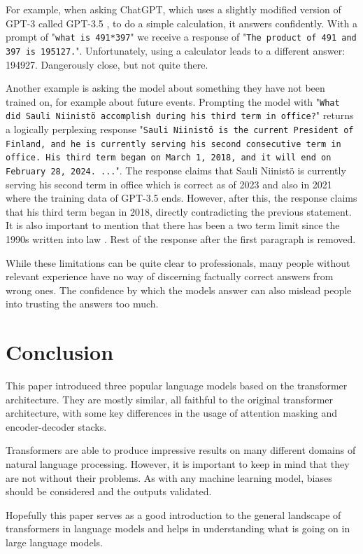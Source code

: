 \documentclass[twoside]{article}
\begin{document}
For example, when asking ChatGPT, which uses a slightly modified version of GPT-3 called 
GPT-3.5 \cite{noauthor_introducing_nodate-1}, to do a simple calculation, it answers confidently. 
With a prompt of "\texttt{what is 491*397}" we receive a response of 
"\texttt{The product of 491 and 397 is 195127.}". Unfortunately, using a calculator
leads to a different answer: 194927. Dangerously close, but not quite there.

Another example is asking the model about something they have not been trained on, for
example about future events. Prompting the model with 
"\texttt{What did Sauli Niinistö accomplish during his third term in office?}" returns
a logically perplexing response "\texttt{Sauli Niinistö is the current President of Finland, 
and he is currently serving his second consecutive term in office. 
His third term began on March 1, 2018, and it will end on February 28, 2024. ...}".
The response claims that Sauli Niinistö is currently serving his second term in office
which is correct as of 2023 and also in 2021 where the training data of GPT-3.5 ends. 
However, after this, the response claims that his third term began
in 2018, directly contradicting the previous statement. It is also important to mention
that there has been a two term limit since the 1990s written into law 
\cite{oy_finlex_nodate}. Rest of the response after the first paragraph is removed.

While these limitations can be quite clear to professionals, many people without relevant
experience have no way of discerning factually correct answers from wrong ones. The confidence
by which the models answer can also mislead people into trusting the answers too much.


\section{Conclusion}
This paper introduced three popular language models based on the transformer architecture.
They are mostly similar, all faithful to the original transformer architecture, with
some key differences in the usage of attention masking and encoder-decoder stacks.

Transformers are able to produce impressive results on many different domains of natural
language processing. However, it is important to keep in mind that they are not without 
their problems. As with any machine learning model,
biases should be considered and the outputs validated. 

Hopefully this paper serves as a good introduction to the general landscape of 
transformers in language models and helps in understanding what is going on in
large language models.

\printbibliography
\end{document}
